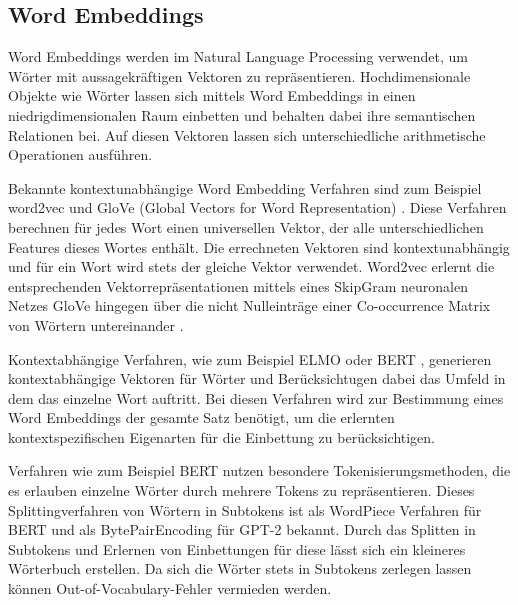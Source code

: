 \subsection{Word Embeddings}
Word Embeddings werden im Natural Language Processing verwendet, um Wörter mit aussagekräftigen Vektoren zu repräsentieren. 
Hochdimensionale Objekte wie Wörter lassen sich mittels Word Embeddings in einen niedrigdimensionalen Raum einbetten und behalten dabei ihre semantischen Relationen bei. 
Auf diesen Vektoren lassen sich unterschiedliche arithmetische Operationen ausführen.

Bekannte kontextunabhängige Word Embedding Verfahren sind zum Beispiel word2vec \citep{word2vec} und GloVe (Global Vectors for Word Representation) \citep{glove}. 
Diese Verfahren berechnen für jedes Wort einen universellen Vektor, der alle unterschiedlichen Features dieses Wortes enthält.
Die errechneten Vektoren sind kontextunabhängig und für ein Wort wird stets der gleiche Vektor verwendet. 
Word2vec erlernt die entsprechenden Vektorrepräsentationen mittels eines SkipGram neuronalen Netzes \citep{word2vec} GloVe hingegen über die nicht Nulleinträge einer Co-occurrence Matrix von Wörtern untereinander \citep{glove}. 

Kontextabhängige Verfahren, wie zum Beispiel ELMO \citep{elmo} oder BERT \citep{DBLP:journals/corr/abs-1810-04805}, generieren kontextabhängige Vektoren für Wörter und Berücksichtugen dabei das Umfeld in dem das einzelne Wort auftritt.
Bei diesen Verfahren wird zur Bestimmung eines Word Embeddings der gesamte Satz benötigt, um die erlernten kontextspezifischen Eigenarten für die Einbettung zu berücksichtigen. 

Verfahren wie zum Beispiel BERT nutzen besondere Tokenisierungsmethoden, die es erlauben einzelne Wörter durch mehrere Tokens zu repräsentieren.
Dieses Splittingverfahren von Wörtern in Subtokens ist als WordPiece Verfahren \citep{wordpiece} für BERT und als BytePairEncoding \citep{bytepairencoding} für GPT-2 bekannt. 
Durch das Splitten in Subtokens und Erlernen von Einbettungen für diese lässt sich ein kleineres Wörterbuch erstellen. 
Da sich die Wörter stets in Subtokens zerlegen lassen können Out-of-Vocabulary-Fehler vermieden werden.

